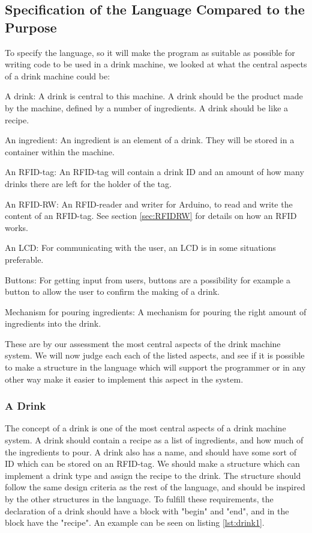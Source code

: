 \subsection{Specification of the Language Compared to the Purpose}
\label{sec:specific}
To specify the language, so it will make the program as suitable as possible for writing code to be used in a drink machine, we looked at what the central aspects of a drink machine could be:
\begin{inddes}
\item[A drink:] A drink is central to this machine. A drink should be the product made by the machine, defined by a number of ingredients. A drink should be like a recipe.
\item[An ingredient:] An ingredient is an element of a drink. They will be stored in a container within the machine. 
\item[An RFID-tag:] An RFID-tag will contain a drink ID and an amount of how many drinks there are left for the holder of the tag.
\item[An RFID-RW:] An RFID-reader and writer for Arduino, to read and write the content of an RFID-tag. See section \ref{sec:RFIDRW} for details on how an RFID works.
\item[An LCD:] For communicating with the user, an LCD is in some situations preferable.
\item[Buttons:] For getting input from users, buttons are a possibility for example a button to allow the user to confirm the making of a drink. 
\item[Mechanism for pouring ingredients:] A mechanism for pouring the right amount of ingredients into the drink.
\end{inddes}
These are by our assessment the most central aspects of the drink machine system. We will now judge each each of the listed aspects, and see if it is possible to make a structure in the language which will support the programmer or in any other way make it easier to implement this aspect in the system.
\subsubsection{A Drink}
The concept of a drink is one of the most central aspects of a drink machine system. A drink should contain a recipe as a list of ingredients, and how much of the ingredients to pour. A drink also has a name, and should have some sort of ID which can be stored on an RFID-tag. We should make a structure which can implement a drink type and assign the recipe to the drink. The structure should follow the same design criteria as the rest of the language, and should be inspired by the other structures in the language. To fulfill these requirements, the declaration of a drink should have a block with "begin" and "end", and in the block have the "recipe". An example can be seen on listing \ref{lst:drink1}.

